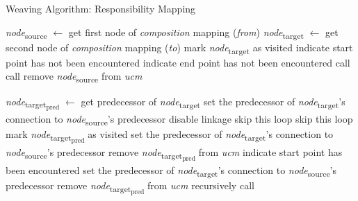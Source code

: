 \begin{algorithm}
    \caption{Weaving Algorithm: Responsibility Mapping}
    \label{alg:1}
	\begin{algorithmic}[1]
			\State \emph{node}\textsubscript{source} $\gets$ get first node of \emph{composition} mapping (\emph{from})
			\State \emph{node}\textsubscript{target} $\gets$ get second node of \emph{composition} mapping (\emph{to})
			\State mark \emph{node}\textsubscript{target} as visited
			\State indicate start point has not been encountered
			\State indicate end point has not been encountered
			\State call 
			\State call 
			\State remove \emph{node}\textsubscript{source} from \emph{ucm}
		\EndFunction
		
				\State \emph{node}\textsubscript{target\textsubscript{pred}} $\gets$ get predecessor of \emph{node}\textsubscript{target}
				 \label{alg:1.1}
					\State set the predecessor of \emph{node}\textsubscript{target}'s connection to \emph{node}\textsubscript{source}'s predecessor
					\State disable linkage
					\State skip this loop
				\EndIf \label{alg:1.2}
				 \label{alg:1.3}
					\State skip this loop
					\State mark \emph{node}\textsubscript{target\textsubscript{pred}} as visited
				\EndIf \label{alg:1.4}
				 \label{alg:1.5}
						\State set the predecessor of \emph{node}\textsubscript{target}'s connection to \emph{node}\textsubscript{source}'s predecessor
						\State remove \emph{node}\textsubscript{target\textsubscript{pred}} from \emph{ucm}
						\State indicate start point has been encountered
					\EndIf \label{alg:1.6}
				 \label{alg:1.7}
					\State set the predecessor of \emph{node}\textsubscript{target}'s connection to \emph{node}\textsubscript{source}'s predecessor
						\State remove \emph{node}\textsubscript{target\textsubscript{pred}} from \emph{ucm}
					\EndIf \label{alg:1.8}
				\Else
					\State recursively call  \label{alg:1.9}
				\EndIf
			\EndFor
		\EndFunction
		
	\end{algorithmic}
\end{algorithm}

